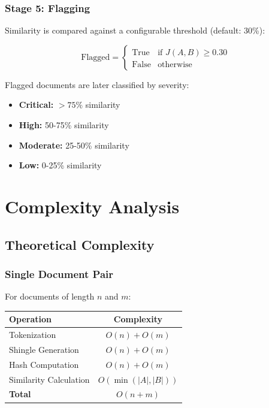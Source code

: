 \documentclass[12pt,oneside,openany]{report}
\begin{document}
\subsection{Stage 5: Flagging}

Similarity is compared against a configurable threshold (default: 30\%):

$$\text{Flagged} = \begin{cases} \text{True} & \text{if } J(A,B) \geq 0.30 \\ \text{False} & \text{otherwise} \end{cases}$$

Flagged documents are later classified by severity:
\begin{itemize}
  \item \textbf{Critical:} $> 75\%$ similarity
  \item \textbf{High:} 50-75\% similarity
  \item \textbf{Moderate:} 25-50\% similarity
  \item \textbf{Low:} 0-25\% similarity
\end{itemize}

\chapter{Complexity Analysis}

\section{Theoretical Complexity}

\subsection{Single Document Pair}

For documents of length $n$ and $m$:

\begin{table}[H]
\centering
\begin{tabular}{|l|c|}
\hline
\textbf{Operation} & \textbf{Complexity} \\
\hline
Tokenization & $O(n) + O(m)$ \\
Shingle Generation & $O(n) + O(m)$ \\
Hash Computation & $O(n) + O(m)$ \\
Similarity Calculation & $O(\min(|A|, |B|))$ \\
\hline
\textbf{Total} & $\boxed{O(n + m)}$ \\
\hline
\end{tabular}
\end{table}
\end{document}
